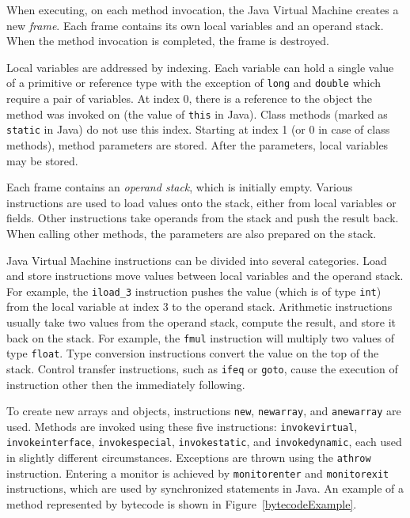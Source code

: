 When executing, on each method invocation, the Java Virtual Machine creates a
new \emph{frame}. Each frame contains its own local variables and an operand
stack. When the method invocation is completed, the frame is destroyed.

Local variables are addressed by indexing. Each variable can hold a single value
of a primitive or reference type with the exception of \texttt{long} and
\texttt{double} which require a pair of variables. At index 0, there is a
reference to the object the method was invoked on (the value of \texttt{this} in
Java). Class methods (marked as \texttt{static} in Java) do not use this index.
Starting at index 1 (or 0 in case of class methods), method parameters are
stored. After the parameters, local variables may be stored.

Each frame contains an \emph{operand stack}, which is initially empty. Various
instructions are used to load values onto the stack, either from local variables
or fields. Other instructions take operands from the stack and push the result
back. When calling other methods, the parameters are also prepared on the stack.

Java Virtual Machine instructions can be divided into several categories. Load
and store instructions move values between local variables and the operand
stack. For example, the \texttt{iload\_3} instruction pushes the value (which is
of type \texttt{int}) from the local variable at index 3 to the operand stack.
Arithmetic instructions usually take two values from the operand stack, compute
the result, and store it back on the stack. For example, the \texttt{fmul}
instruction will multiply two values of type \texttt{float}. Type conversion
instructions convert the value on the top of the stack. Control transfer
instructions, such as \texttt{ifeq} or \texttt{goto}, cause the execution of
instruction other then the immediately following.

To create new arrays and objects, instructions \texttt{new}, \texttt{newarray},
and \texttt{anewarray} are used. Methods are invoked using these five
instructions: \texttt{invokevirtual}, \texttt{invokeinterface},
\texttt{invokespecial}, \texttt{invokestatic}, and \texttt{invokedynamic}, each
used in slightly different circumstances. Exceptions are thrown using the
\texttt{athrow} instruction. Entering a monitor is achieved by
\texttt{monitorenter} and \texttt{monitorexit} instructions, which are used by
synchronized statements in Java. An example of a method represented by bytecode
is shown in Figure~\ref{bytecodeExample}.

